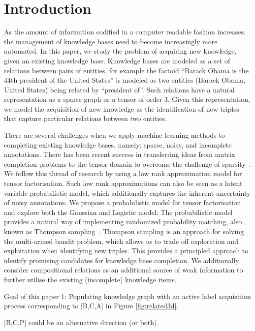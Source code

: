 
\section{Introduction}

As the amount of information codified in a computer readable fashion increases, the management
of knowledge bases need to become increasingly more automated. In this paper, we study
the problem of acquiring new knowledge, given an existing knowledge base. Knowledge bases
are modeled as a set of relations between pairs of entities, for example the factoid
``Barack Obama is the 44th president of the United States''
is modeled as two entities (Barack Obama, United States) being related by ``president of''.
Such relations have a natural representation as a sparse graph or a tensor of order 3.
Given this representation, we model the acquisition of new knowledge as the
identification of new triples that capture particular relations between two entities.

There are several challenges when we apply machine learning methods to completing
existing knowledge bases, namely:
sparse, noisy, and incomplete annotations.
There has been recent success in transferring ideas from matrix completion problems to
the tensor domain to overcome the challenge of sparsity~\cite{unknown}.
We follow this thread of research by using a low rank approximation model for tensor
factorisation. Such low rank approximations can also be seen as a latent variable probabilistic
model, which additionally captures the inherent uncertainty of noisy annotations.
We propose a probabilistic model for tensor factorisation and explore both the Gaussian
and Logistic model. The probabilistic model provides a natural way of implementing
randomized probability matching, also known as Thompson sampling~\cite{scott10bandit}.
Thompson sampling is an approach for solving the multi-armed bandit problem,
which allows us to trade off exploration and exploitation when identifying new triples.
This provides a principled approach to identify promising candidates for knowledge base
completion.
We additionally consider compositional relations as an additional source of weak information
to further utilise the existing (incomplete) knowledge items.

Goal of this paper 1: Populating knowledge graph with an active label acquisition process corresponding to [B,C,A] in Figure \ref{fig:related3d}.

[B,C,P] could be an alternative direction (or both).
